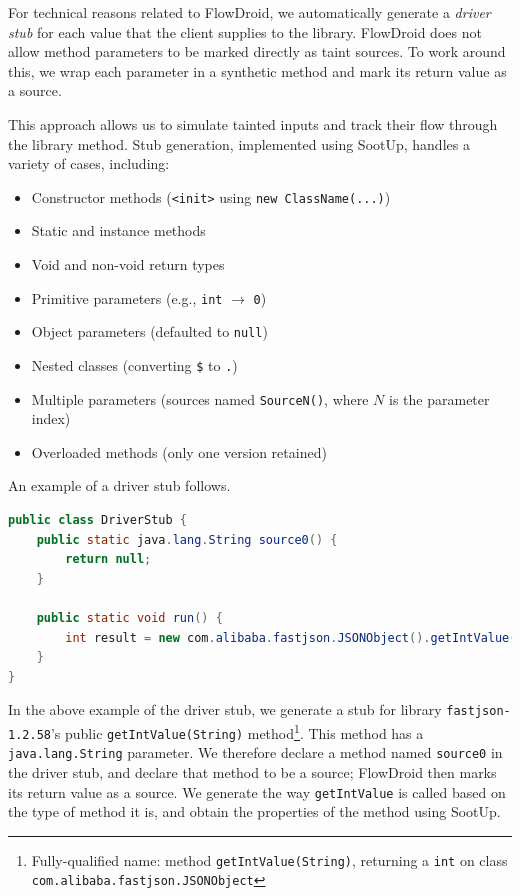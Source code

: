 For technical reasons related to FlowDroid, we automatically generate a \textit{driver stub} for each value that the client supplies to the library. FlowDroid does not allow method parameters to be marked directly as taint sources. To work around this, we wrap each parameter in a synthetic method and mark its return value as a source.

This approach allows us to simulate tainted inputs and track their flow through the library method. Stub generation, implemented using SootUp, handles a variety of cases, including:
\begin{itemize}
  \item Constructor methods (\texttt{<init>} using \texttt{new ClassName(...)})
  \item Static and instance methods
  \item Void and non-void return types
  \item Primitive parameters (e.g., \texttt{int} $\rightarrow$ \texttt{0})
  \item Object parameters (defaulted to \texttt{null})
  \item Nested classes (converting \texttt{\$} to \texttt{.})
  \item Multiple parameters (sources named \texttt{SourceN()}, where $N$ is the parameter index)
  \item Overloaded methods (only one version retained)
\end{itemize}

An example of a driver stub follows.
\begin{lstlisting}[language=Java]
public class DriverStub {
    public static java.lang.String source0() {
        return null;
    }

    public static void run() {
        int result = new com.alibaba.fastjson.JSONObject().getIntValue(source0());
    }
}
\end{lstlisting}

In the above example of the driver stub, we generate a stub for library \texttt{fastjson-} \texttt{1.2.58}'s public \texttt{getIntValue(String)} method\footnote{Fully-qualified name: method \texttt{getIntValue(String)}, returning a \texttt{int} on class \texttt{com.alibaba.fastjson.JSONObject}}. This method has a \texttt{java.lang.String} parameter. We therefore declare a method named \texttt{source0} in the driver stub, and declare that method to be a source; FlowDroid then marks its return value as a source. We generate the way \texttt{getIntValue} is called based on the type of method it is, and obtain the properties of the method using SootUp.


